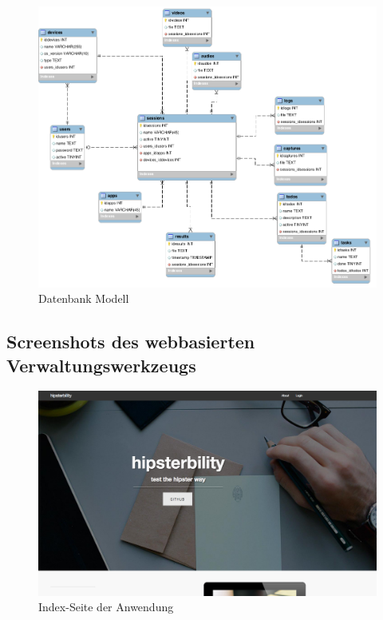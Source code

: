 \begin{figure}[h!]
	\centering
	\includegraphics[width=\linewidth,keepaspectratio]{img/db_model.png}
	\caption{Datenbank Modell}
	\label{figure-db-model}
\end{figure}
\newpage

\subsection{Screenshots des webbasierten Verwaltungswerkzeugs}
\label{anhang:screens-webtool}

\begin{figure}[h!]
	\centering
		\includegraphics[width=\linewidth,keepaspectratio]{img/index-page.png}
	\caption{Index-Seite der Anwendung}
	\label{fig: index-page}
\end{figure}

